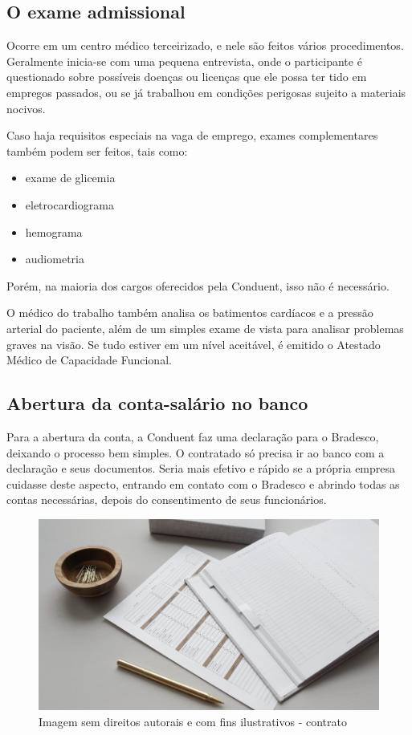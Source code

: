 \documentclass[12pt]{article}
\begin{document}
\newpage

\subsection{O exame admissional}

Ocorre em um centro médico terceirizado, e nele são feitos vários procedimentos. Geralmente inicia-se com uma pequena entrevista, onde o participante é questionado sobre possíveis doenças ou licenças que ele possa ter tido em empregos passados, ou se já trabalhou em condições perigosas sujeito a materiais nocivos. 

Caso haja requisitos especiais na vaga de emprego, exames complementares também podem ser feitos, tais como: 

\begin{itemize}
\item exame de glicemia
\item eletrocardiograma
\item hemograma
\item audiometria

\end{itemize}

 Porém, na maioria dos cargos oferecidos pela Conduent, isso não é necessário.

O médico do trabalho também analisa os batimentos cardíacos e a pressão arterial do paciente, além de um simples exame de vista para analisar problemas graves na visão. Se tudo estiver em um nível aceitável, é emitido o Atestado Médico de Capacidade Funcional.

\newpage
\subsection{Abertura da conta-salário no banco}

Para a abertura da conta, a Conduent faz uma declaração para o Bradesco, deixando o processo bem simples. O contratado só precisa ir ao banco com a declaração e seus documentos. Seria mais efetivo e rápido se a própria empresa cuidasse deste aspecto, entrando em contato com o Bradesco e abrindo todas as contas necessárias, depois do consentimento de seus funcionários.


\begin{figure}[h]
	\centering
	\includegraphics[scale=0.4]{build/images/fazendoconta.jpg}
	\caption{Imagem sem direitos autorais e com fins ilustrativos - contrato}
\end{figure}
\end{document}

